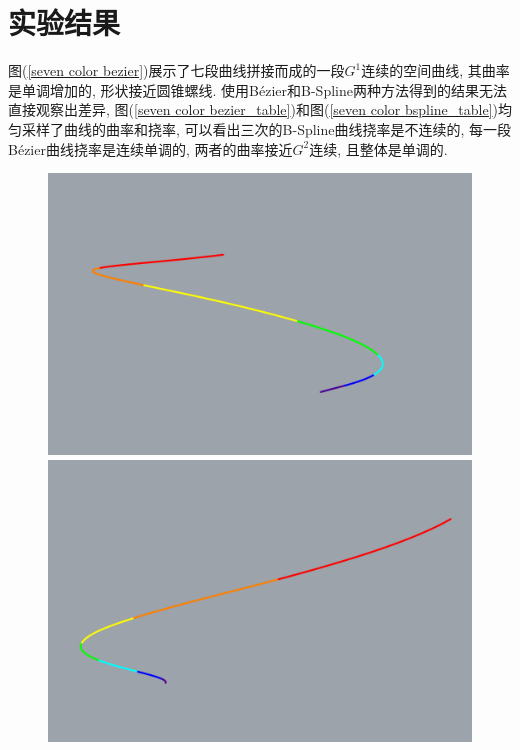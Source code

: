 \documentclass[utf8]{ctexart} %
\numberwithin{figure}{section}
\numberwithin{equation}{section}
\begin{document}
		\section{实验结果}
		图(\ref{seven color bezier})展示了七段曲线拼接而成的一段$G^1$连续的空间曲线, 其曲率是单调增加的, 形状接近圆锥螺线. 使用B\'ezier和B-Spline两种方法得到的结果无法直接观察出差异, 图(\ref{seven color bezier_table})和图(\ref{seven color bspline_table})均匀采样了曲线的曲率和挠率, 可以看出三次的B-Spline曲线挠率是不连续的, 每一段B\'ezier曲线挠率是连续单调的, 两者的曲率接近$G^2$连续, 且整体是单调的. 
		\begin{figure}[ht]
			\centering
			
			\begin{minipage}[b]{0.45\textwidth} %
				\centering
				\includegraphics[width=\textwidth]{figures/Seven_Color_Bezier.png}\\
				\includegraphics[width=\textwidth]{figures/Seven_Color_Bezier_Front.png}

\end{minipage}
\end{figure}
\end{document}
